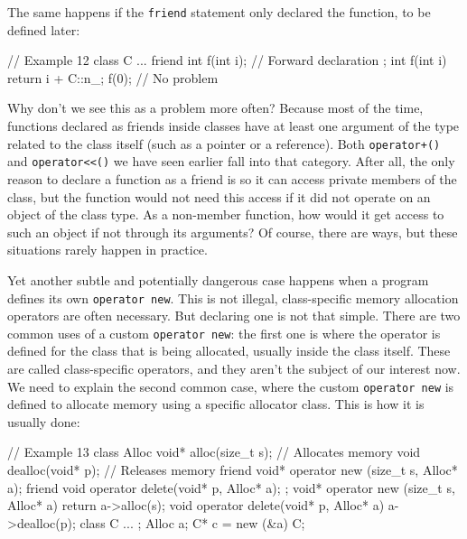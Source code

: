 The same happens if the \texttt{friend} statement only declared the function, to be defined later:

\begin{code}
// Example 12
class C {
  ...
  friend int f(int i);    // Forward declaration
};
int f(int i) { return i + C::n_; }
f(0);        // No problem
\end{code}

Why don't we see this as a problem more often? Because most of the time, functions declared as friends inside classes have at least one argument of the type related to the class itself (such as a pointer or a reference). Both \texttt{operator+()} and \texttt{operator\textless{}\textless{}()} we have seen earlier fall into that category. After all, the only reason to declare a function as a friend is so it can access private members of the class, but the function would not need this access if it did not operate on an object of the class type. As a non-member function, how would it get access to such an object if not through its arguments? Of course, there are ways, but these situations rarely happen in practice.

Yet another subtle and potentially dangerous case happens when a program defines its own \texttt{operator\ new}. This is not illegal, class-specific memory allocation operators are often necessary. But declaring one is not that simple. There are two common uses of a custom \texttt{operator\ new}: the first one is where the operator is defined for the class that is being allocated, usually inside the class itself. These are called class-specific operators, and they aren't the subject of our interest now. We need to explain the second common case, where the custom \texttt{operator\ new} is defined to allocate memory using a specific allocator class. This is how it is usually done:

\begin{code}
// Example 13
class Alloc {
  void* alloc(size_t s);    // Allocates memory
  void dealloc(void* p);     // Releases memory
  friend void* operator new (size_t s, Alloc* a);
  friend void operator delete(void* p, Alloc* a);
};
void* operator new (size_t s, Alloc* a) {
  return a->alloc(s);
}
void operator delete(void* p, Alloc* a) {
  a->dealloc(p);
}
class C { ... };
Alloc a;
C* c = new (&a) C;
\end{code}

